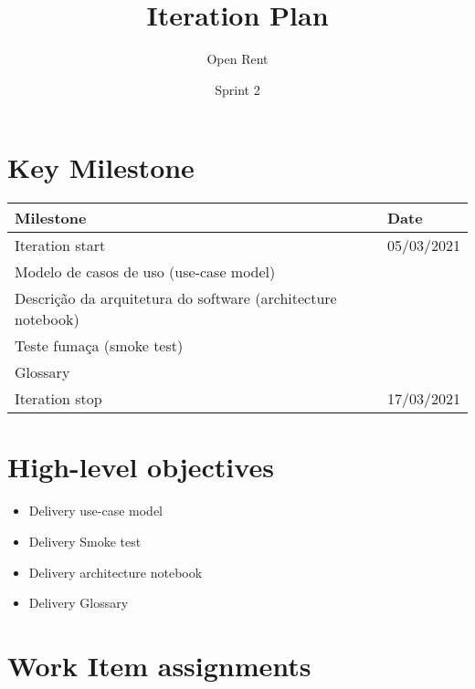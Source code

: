 \documentclass[a4paper,notitlepage]{article}%
\begin{document}
\title{Iteration Plan}
\author{Open Rent}
\date{Sprint 2}
\maketitle

\section{Key Milestone}


\noindent\begin{tabular}{|l|l|}
\hline
Milestone       & Date \\ \hline
Iteration start & 05/03/2021 \\ \hline
Modelo de casos de uso (use-case model) &      \\ \hline
Descrição da arquitetura do software (architecture notebook) &      \\ \hline
Teste fumaça (smoke test) & \\ \hline
Glossary & \\ \hline
Iteration stop  & 17/03/2021 \\ \hline
\end{tabular}

\section{High-level objectives}


\begin{itemize}
	\item	Delivery use-case model
	\item	Delivery Smoke test
	\item	Delivery architecture notebook
	\item Delivery Glossary
\end{itemize}

\section{Work Item assignments}

\end{document}
